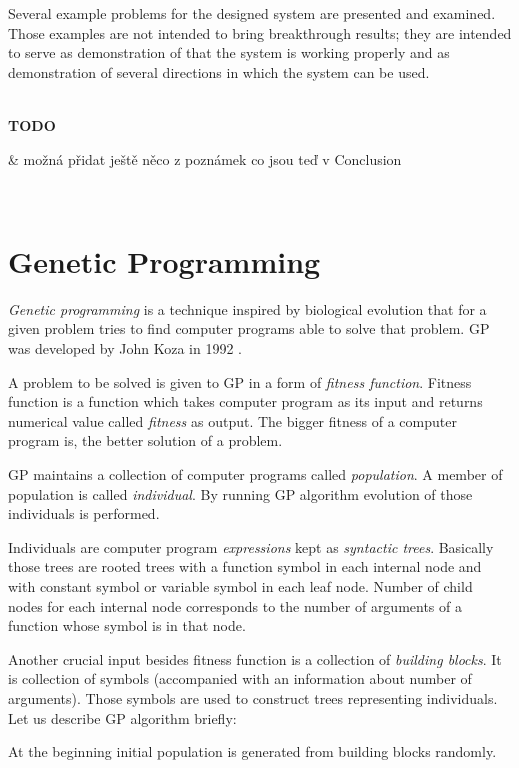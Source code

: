\documentclass[12pt,a4paper]{report}
\newcommand{\Lets}{Let us\xspace}
\newenvironment{todo}
{ ~\\[0.5em]
  {\color{red}\textbf{TODO}}
  \begin{easylist}[itemize]}
{ \end{easylist}
  ~}
\begin{document}
Several example problems for the designed system are presented 
and examined. Those examples are not intended to 
bring breakthrough results; they are intended to 
serve as demonstration of that the system is working properly
and as demonstration of several directions in which the system
can be used.      


\begin{todo}
 & možná přidat ještě něco z poznámek co jsou teď v Conclusion
\end{todo}

	


\chapter{Genetic Programming}
\label{GP}

\textit{Genetic programming} is a technique inspired by biological evolution
that for a given problem tries to find computer programs able to solve that problem. 
GP was developed by John Koza in 1992 \cite{koza92}.

A problem to be solved is given to GP in a form of \textit{fitness function}. 
Fitness function is a function which takes computer program as its input and 
returns numerical value called \textit{fitness} as output. 
The bigger fitness of a computer program is, the better solution of a problem.

GP maintains a collection of computer programs called \textit{population}. 
A member of population is called \textit{individual}. 
By running GP algorithm evolution of those individuals is performed.

Individuals are computer program \textit{expressions} kept as \textit{syntactic trees}. 
Basically those trees are rooted trees with a function symbol in each internal node 
and with constant symbol or variable symbol in each leaf node. 
Number of child nodes for each internal node corresponds to the number of arguments of a function whose symbol is in that node.

Another crucial input besides fitness function is a collection of \textit{building blocks}.
It is collection of symbols (accompanied with an information about number of arguments).
Those symbols are used to construct trees representing individuals.\\

\Lets describe GP algorithm briefly:

At the beginning initial population is generated from building blocks randomly.
\end{document}
